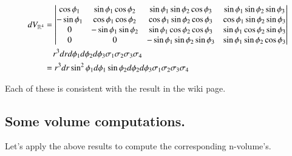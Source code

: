 \begin{align*}
dV_{\Rm{4}} &=
\begin{vmatrix}
\cos\phi_1 & \sin\phi_1 \cos\phi_2 & \sin\phi_1 \sin\phi_2 \cos\phi_3 & \sin\phi_1 \sin\phi_2 \sin\phi_3  \\
-\sin\phi_1 & \cos\phi_1 \cos\phi_2 & \cos\phi_1 \sin\phi_2 \cos\phi_3 & \cos\phi_1 \sin\phi_2 \sin\phi_3  \\
         0 & -\sin\phi_1 \sin\phi_2 & \sin\phi_1 \cos\phi_2 \cos\phi_3 & \sin\phi_1 \cos\phi_2 \sin\phi_3  \\
         0 &                     0 & -\sin\phi_1 \sin\phi_2 \sin\phi_3 & \sin\phi_1 \sin\phi_2 \cos\phi_3  \\
\end{vmatrix} \\
&\quad r^3 dr d\phi_1 d\phi_2 d\phi_3 \sigma_1 \sigma_2 \sigma_3 \sigma_4 \\
&=
%
%
%
%
%
%
%
%
r^3 dr \sin^2\phi_1 d\phi_1 \sin\phi_2 d\phi_2 d\phi_3 \sigma_1 \sigma_2 \sigma_3 \sigma_4 \\
\end{align*}

Each of these is consistent with the result in the wiki page.

\subsection{Some volume computations. }

Let's apply the above results to compute the corresponding n-volume's.



